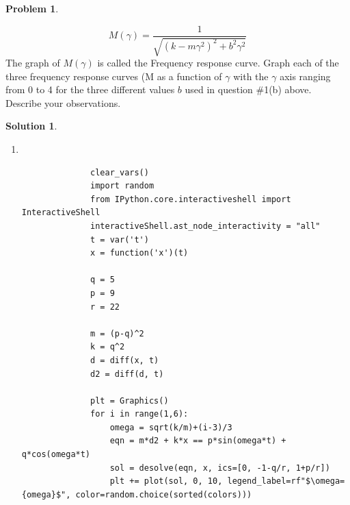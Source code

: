 \documentclass[10pt]{article}
\makeatletter
\theoremstyle{definition}
\newtheorem{problem}{Problem}
\newtheorem{soln}{Solution}
\newcommand{\boxspacing}{\kern\kvtcb@left@rule\kern\kvtcb@boxsep}
\newcommand{\prompt}[4]{
    \ttfamily\llap{{\color{#2}[#3]:\hspace{3pt}#4}}\vspace{-\baselineskip}
}
\makeatother
\begin{document}
\begin{problem}
\begin{enumerate}[label=(\alph*)]
\begin{enumerate}[label=\roman*.]
                \begin{equation}
                  M\left(\gamma\right)=\frac{1}{\sqrt{\left(k-m\gamma^2\right)^2+b^2\gamma^2}}
                \end{equation}
                The graph of $M\left(\gamma\right)$ is called the Frequency response curve. Graph each of the three frequency response curves
                (M as a function of $\gamma$ with the $\gamma$ axis ranging from 0 to 4 for the three different values $b$ used in question \#1(b) above. Describe your observations.
        \end{enumerate}
\end{enumerate}
\end{problem}
\newpage

\begin{soln} ~
  \begin{enumerate}[label=(\alph*)]
    \item   ~\begin{tcolorbox}[breakable, size=fbox, boxrule=1pt, pad at break*=1mm,colback=cellbackground, colframe=cellborder]
            \prompt{In}{incolor}{1}{\boxspacing}
            \begin{verbatim}
              clear_vars()
              import random
              from IPython.core.interactiveshell import InteractiveShell
              interactiveShell.ast_node_interactivity = "all"
              t = var('t')
              x = function('x')(t)

              q = 5
              p = 9
              r = 22

              m = (p-q)^2
              k = q^2
              d = diff(x, t)
              d2 = diff(d, t)

              plt = Graphics()
              for i in range(1,6):
                  omega = sqrt(k/m)+(i-3)/3
                  eqn = m*d2 + k*x == p*sin(omega*t) + q*cos(omega*t)
                  sol = desolve(eqn, x, ics=[0, -1-q/r, 1+p/r])
                  plt += plot(sol, 0, 10, legend_label=rf"$\omega={omega}$", color=random.choice(sorted(colors)))


\end{verbatim}
\end{tcolorbox}
\end{enumerate}
\end{soln}
\end{document}
